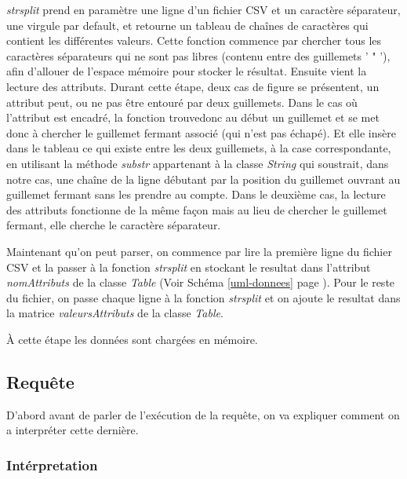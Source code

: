 \documentclass[oneside,13pt,a4paper]{report}
\begin{document}
\textit{strsplit} prend en paramètre une ligne d'un fichier CSV et un caractère séparateur, une virgule par default, et retourne un tableau de chaînes de caractères qui contient les différentes valeurs. Cette fonction commence par chercher tous les caractères séparateurs qui ne sont pas libres (contenu entre des guillemets ' " '), afin d'allouer de l'espace mémoire pour stocker le résultat.
Ensuite vient la lecture des attributs. Durant cette étape, deux cas de figure se présentent, un attribut peut, ou ne pas être entouré par deux guillemets. Dans le cas où l'attribut est encadré, la fonction trouvedonc au début un guillemet et se met donc à chercher le guillemet fermant associé (qui n'est pas échapé). Et elle insère dans le tableau ce qui existe entre les deux guillemets, à la case correspondante, en utilisant la méthode \textit{substr} appartenant à la classe \textit{String} qui soustrait, dans notre cas, une chaîne de la ligne débutant par la position du guillemet ouvrant au guillemet fermant sans les prendre au compte. Dans le deuxième cas, la lecture des attributs fonctionne de la même façon mais au lieu de chercher le guillemet fermant, elle cherche le caractère séparateur.

Maintenant qu'on peut parser, on commence par lire la première ligne du fichier CSV et la passer à la fonction \textit{strsplit} en stockant le resultat dans l'attribut \textit{nomAttributs} de la classe \textit{Table} (Voir Schéma \ref{uml-donnees} page \pageref{uml-donnees}). Pour le reste du fichier, on passe chaque ligne à la fonction \textit{strsplit} et on ajoute le resultat dans la matrice \textit{valeursAttributs} de la classe \textit{Table}.

À cette étape les données sont chargées en mémoire.

\subsection{Requête}

D'abord avant de parler de l'exécution de la requête, on va expliquer comment on a interpréter cette dernière.

\subsubsection{Intérpretation}
\end{document}
